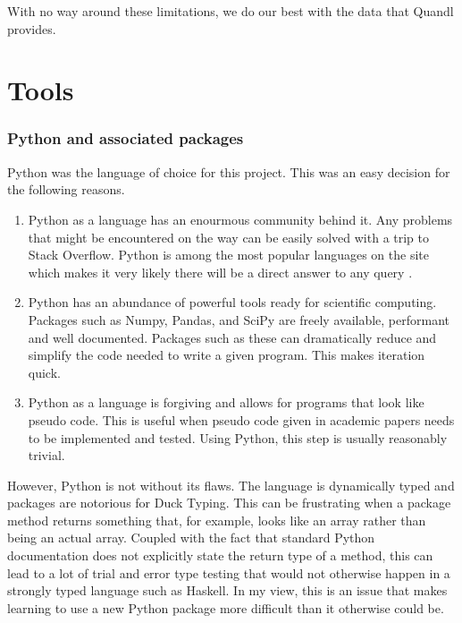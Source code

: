 \documentclass{report}
\begin{document}
With no way around these limitations, we do our best with the data that Quandl provides.

\section{Tools}
\subsubsection{Python and associated packages}

Python was the language of choice for this project. This was an easy decision for the following reasons.

\begin{enumerate}
  \item Python as a language has an enourmous community behind it. Any problems that might be encountered on the way can be easily solved with a trip to Stack Overflow. Python is among the most popular languages on the site which makes it very likely there will be a direct answer to any query \cite{website:redmonk-languages}. 
  
  \item Python has an abundance of powerful tools ready for scientific computing. Packages such as Numpy, Pandas, and SciPy are freely available, performant and well documented. Packages such as these can dramatically reduce and simplify the code needed to write a given program. This makes iteration quick.

  \item Python as a language is forgiving and allows for programs that look like pseudo code. This is useful when pseudo code given in academic papers needs to be implemented and tested. Using Python, this step is usually reasonably trivial.

\end{enumerate}

However, Python is not without its flaws. The language is dynamically typed and packages are notorious for Duck Typing. This can be frustrating when a package method returns something that, for example, looks like an array rather than being an actual array. Coupled with the fact that standard Python documentation does not explicitly state the return type of a method, this can lead to a lot of trial and error type testing that would not otherwise happen in a strongly typed language such as Haskell. In my view, this is an issue that makes learning to use a new Python package more difficult than it otherwise could be.
\end{document}
